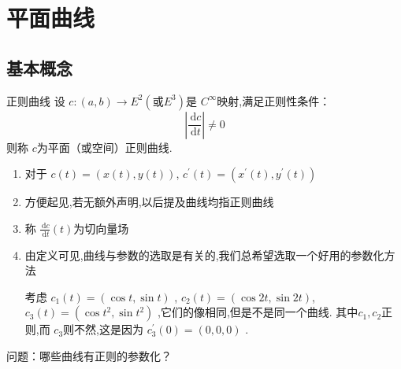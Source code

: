 \documentclass[../../古典微分几何.tex]{subfiles}
\begin{document}
\chapter{平面曲线}

\section{基本概念}

\begin{definition}{正则曲线}
    设 \(  c: \left( a,b \right)\to E^{2} \left( \text{或}E^{3} \right)   \)是 \(  C^{\infty}  \)映射,满足正则性条件： \[
    \left| \frac{\,\mathrm{d} c }{\,\mathrm{d} t }  \right| \neq 0 
    \]则称 \(  c  \)为平面（或空间）正则曲线.   
\end{definition}
    
\begin{remark}
    \begin{enumerate}
        \item 对于 \(  c\left( t \right)= \left( x\left( t \right),y\left( t \right)   \right)    \), \(  c^{\prime} \left( t \right)= \left( x^{\prime} \left( t \right)  ,y^{\prime} \left( t \right) \right)    \)  
        \item 方便起见,若无额外声明,以后提及曲线均指正则曲线
        \item 称 \(  \frac{\,\mathrm{d} c }{\,\mathrm{d} t } \left( t \right)   \)为切向量场
        \item 由定义可见,曲线与参数的选取是有关的,我们总希望选取一个好用的参数化方法
        \begin{example}
            考虑 \(  c_1\left( t \right)= \left( \cos t,\sin t \right)    \) ,  \(  c_2\left( t \right)= \left( \cos 2t,\sin 2t \right)    \), \(  c_3\left( t \right)= \left( \cos t^{2},\sin t^{2} \right)    \)  ,它们的像相同,但是不是同一个曲线.  其中\(  c_1,c_2  \)正则,而 \(  c_3  \)则不然,这是因为 \(  c_3^{\prime} \left( 0 \right)= \left( 0,0,0 \right)    \) .  
        \end{example}
        
        \hspace*{\fill} 
        
    \end{enumerate}
    
\end{remark}

\noindent 问题：哪些曲线有正则的参数化？
\end{document}
